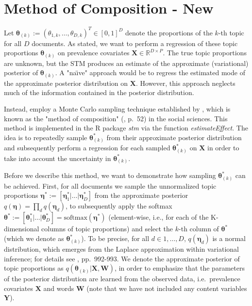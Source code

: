 \section{Method of Composition - New}

Let $\boldsymbol{\theta}_{(k)}:=(\theta_{1,k}, \dots, \theta_{D,k})^T \in [0,1]^{D}$ denote the proportions of the $k$-th topic for all $D$ documents. As stated, we want to perform a regression of these topic proportions $\boldsymbol{\theta}_{(k)}$ on prevalence covariates $\boldsymbol{X} \in \mathbb{R}^{D \times P}$. The true topic proportions are unknown, but the STM produces an estimate of the approximate (variational) posterior of $\boldsymbol{\theta}_{(k)}$. A "na{\"\i}ve" approach would be to regress the estimated mode of the approximate posterior distribution on $\boldsymbol{X}$. However, this approach neglects much of the information contained in the posterior distribution. 

Instead, \cite{roberts2016model} employ a Monte Carlo sampling technique established by \cite{treier2008democracy}, which is known as the "method of composition" (\citealp{tanner2012tools}, p.\ 52) in the social sciences. This method is implemented in the R package \textit{stm} via the function \textit{estimateEffect}. The idea is to repeatedly sample $\boldsymbol{\theta}_{(k)}^*$ from their approximate posterior distribution and subsequently perform a regression for each sampled $\boldsymbol{\theta}_{(k)}^*$ on $\boldsymbol{X}$ in order to take into account the uncertainty in $\boldsymbol{\theta}_{(k)}^*$.

Before we describe this method, we want to demonstrate how sampling $\boldsymbol{\theta}_{(k)}^*$ can be achieved. First, for all documents we sample the unnormalized topic proportions $\boldsymbol{\eta}^* := [\boldsymbol{\eta}^*_1 | \dots | \boldsymbol{\eta}_D^*]$ from the approximate posterior $q(\boldsymbol{\eta}) = \prod_d q(\boldsymbol{\eta}_d)$, to subsequently apply the softmax $\boldsymbol{\theta}^* := [\boldsymbol{\theta}^*_1 | \dots | \boldsymbol{\theta}^*_D] = \text{softmax}(\boldsymbol{\eta}^*)$ (element-wise, i.e., for each of the K-dimensional columns of topic proportions) and select the $k$-th column of $\boldsymbol{\theta}^*$ (which we denote as $\boldsymbol{\theta}_{(k)}^*$). To be precise, for all $d \in {1, \dots, D}$, $q(\boldsymbol{\eta}_d)$ is a normal distribution, which emerges from the Laplace approximation within variational inference; for details see \cite{roberts2016model}, pp.\ 992-993. We denote the approximate posterior of topic proportions as $q(\boldsymbol{\theta}_{(k)} | \boldsymbol{X}, \boldsymbol{W})$, in order to emphasize that the parameters of the posterior distribution are learned from the observed data, i.e.\ prevalence covariates $\boldsymbol{X}$ and words $\boldsymbol{W}$ (note that we have not included any content variables $\boldsymbol{Y}$).

